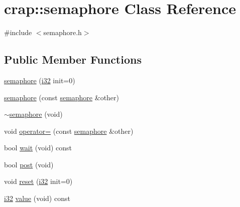\hypertarget{classcrap_1_1semaphore}{\section{crap\-:\-:semaphore Class Reference}
\label{classcrap_1_1semaphore}
}


{\ttfamily \#include $<$semaphore.\-h$>$}

\subsection*{Public Member Functions}
\begin{DoxyCompactItemize}
\item 
\hyperlink{classcrap_1_1semaphore_af83b959cd6a4abf6b92466b9d05c2c62}{semaphore} (\hyperlink{types_8h_a48d6cd8e4135fb2ff7e7f2dac84089ec}{i32} init=0)
\item 
\hyperlink{classcrap_1_1semaphore_aca0dcce84aae3fe46b3a4fc5261afea8}{semaphore} (const \hyperlink{classcrap_1_1semaphore}{semaphore} \&other)
\item 
\hyperlink{classcrap_1_1semaphore_af6bcf4fa59d0c088d05648a772c7669e}{$\sim$semaphore} (void)
\item 
void \hyperlink{classcrap_1_1semaphore_a1674cbbfd5e4b0ca6c941b32507504dd}{operator=} (const \hyperlink{classcrap_1_1semaphore}{semaphore} \&other)
\item 
bool \hyperlink{classcrap_1_1semaphore_a4b7916d4d75f97869b3dc16a272737bc}{wait} (void) const 
\item 
bool \hyperlink{classcrap_1_1semaphore_ac29c0584914d3d53f8894eafb58eec57}{post} (void)
\item 
void \hyperlink{classcrap_1_1semaphore_a86e92049079d21e4938de7dd96f0633e}{reset} (\hyperlink{types_8h_a48d6cd8e4135fb2ff7e7f2dac84089ec}{i32} init=0)
\item 
\hyperlink{types_8h_a48d6cd8e4135fb2ff7e7f2dac84089ec}{i32} \hyperlink{classcrap_1_1semaphore_a04ba33907ab0591c0a409bcbe0fb87fc}{value} (void) const 
\end{DoxyCompactItemize}


